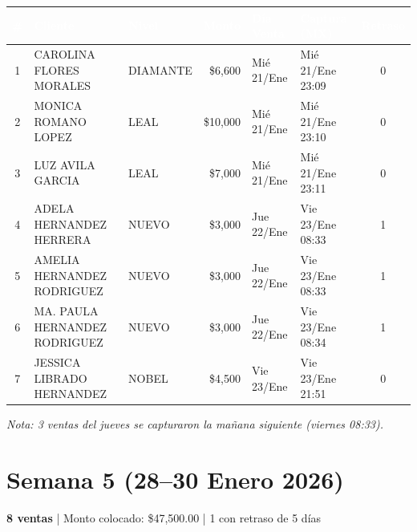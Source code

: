 \documentclass[11pt,a4paper]{article}
\begin{document}
\vspace{0.3cm}
\begin{center}
\renewcommand{\arraystretch}{1.3}
\footnotesize
\begin{tabular}{|c|l|l|r|l|l|c|}
\hline
\rowcolor{headerblue}
\textcolor{white}{\textbf{\#}} &
\textcolor{white}{\textbf{Cliente}} &
\textcolor{white}{\textbf{Nivel}} &
\textcolor{white}{\textbf{Monto}} &
\textcolor{white}{\textbf{D\'ia Venta}} &
\textcolor{white}{\textbf{Captura (MX)}} &
\textcolor{white}{\textbf{Retraso}} \\
\hline
1 & CAROLINA FLORES MORALES & DIAMANTE & \$6,600 & Mi\'e 21/Ene & Mi\'e 21/Ene 23:09 & 0 \\
\hline
\rowcolor{lightgray}
2 & MONICA ROMANO LOPEZ & LEAL & \$10,000 & Mi\'e 21/Ene & Mi\'e 21/Ene 23:10 & 0 \\
\hline
3 & LUZ AVILA GARCIA & LEAL & \$7,000 & Mi\'e 21/Ene & Mi\'e 21/Ene 23:11 & 0 \\
\hline
\rowcolor{lightgray}
4 & ADELA HERNANDEZ HERRERA & NUEVO & \$3,000 & Jue 22/Ene & \textcolor{alertred}{Vie 23/Ene 08:33} & \textcolor{alertred}{1} \\
\hline
5 & AMELIA HERNANDEZ RODRIGUEZ & NUEVO & \$3,000 & Jue 22/Ene & \textcolor{alertred}{Vie 23/Ene 08:33} & \textcolor{alertred}{1} \\
\hline
\rowcolor{lightgray}
6 & MA. PAULA HERNANDEZ RODRIGUEZ & NUEVO & \$3,000 & Jue 22/Ene & \textcolor{alertred}{Vie 23/Ene 08:34} & \textcolor{alertred}{1} \\
\hline
7 & JESSICA LIBRADO HERNANDEZ & NOBEL & \$4,500 & Vie 23/Ene & Vie 23/Ene 21:51 & 0 \\
\hline
\end{tabular}
\end{center}

\vspace{0.2cm}
\textit{Nota: 3 ventas del jueves se capturaron la ma\~nana siguiente (viernes 08:33).}

\section*{\textcolor{headerblue}{Semana 5 (28--30 Enero 2026)}}
\textbf{8 ventas} | Monto colocado: \$47,500.00 | \textcolor{alertred}{1 con retraso de 5 d\'ias}
\end{document}
